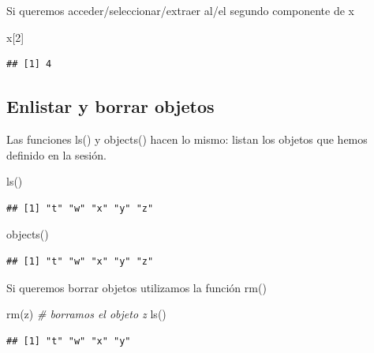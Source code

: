 \documentclass[
]{book}
\newenvironment{Shaded}{\begin{snugshade}}{\end{snugshade}}
\newcommand{\CommentTok}[1]{\textcolor[rgb]{0.56,0.35,0.01}{\textit{#1}}}
\newcommand{\DecValTok}[1]{\textcolor[rgb]{0.00,0.00,0.81}{#1}}
\newcommand{\FunctionTok}[1]{\textcolor[rgb]{0.00,0.00,0.00}{#1}}
\newcommand{\NormalTok}[1]{#1}
\begin{document}
Si queremos acceder/seleccionar/extraer al/el segundo componente de x

\begin{Shaded}
\begin{Highlighting}[]
\NormalTok{x[}\DecValTok{2}\NormalTok{]}
\end{Highlighting}
\end{Shaded}

\begin{verbatim}
## [1] 4
\end{verbatim}

\hypertarget{enlistar-y-borrar-objetos}{%
\subsection{Enlistar y borrar objetos}\label{enlistar-y-borrar-objetos}}

Las funciones ls() y objects() hacen lo mismo: listan los objetos que hemos definido en la sesión.

\begin{Shaded}
\begin{Highlighting}[]
\FunctionTok{ls}\NormalTok{()}
\end{Highlighting}
\end{Shaded}

\begin{verbatim}
## [1] "t" "w" "x" "y" "z"
\end{verbatim}

\begin{Shaded}
\begin{Highlighting}[]
\FunctionTok{objects}\NormalTok{()}
\end{Highlighting}
\end{Shaded}

\begin{verbatim}
## [1] "t" "w" "x" "y" "z"
\end{verbatim}

Si queremos borrar objetos utilizamos la función rm()

\begin{Shaded}
\begin{Highlighting}[]
\FunctionTok{rm}\NormalTok{(z)  }\CommentTok{\# borramos el objeto z}
\FunctionTok{ls}\NormalTok{()}
\end{Highlighting}
\end{Shaded}

\begin{verbatim}
## [1] "t" "w" "x" "y"
\end{verbatim}
\end{document}
